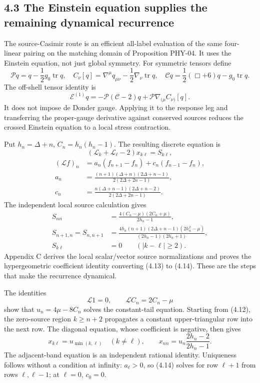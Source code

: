 \documentclass[a4paper,11pt]{article}
\numberwithin{equation}{section}
\begin{document}
\hypertarget{the-einstein-equation-supplies-the-remaining-dynamical-recurrence}{%
\subsection{4.3 The Einstein equation supplies the remaining dynamical recurrence}\label{the-einstein-equation-supplies-the-remaining-dynamical-recurrence}}

The source-Casimir route is an efficient all-label evaluation of the same four-linear pairing on the matching domain of Proposition PHY-04. It uses the Einstein equation, not just global symmetry. For symmetric tensors define \[
\mathcal Pq=q-\frac12g_0\operatorname{tr}q,\quad
C_\nu[q]=\nabla^\mu q_{\mu\nu}-\frac12\nabla_\nu\operatorname{tr}q,\quad
\mathcal Cq=\frac12(\Box+6)q-g_0\operatorname{tr}q .
\] The off-shell tensor identity is \[
\mathcal E^{(1)}q
=-\mathcal P(\mathcal C-2)q
+\mathcal P\nabla_{(\mu}C_{\nu)}[q].
\tag{4.13}
\] It does not impose de Donder gauge. Applying it to the response leg and transferring the proper-gauge derivative against conserved sources reduces the crossed Einstein equation to a local stress contraction.

Put \(h_n=\Delta+n\), \(C_n=h_n(h_n-1)\). The resulting discrete equation is \[
(\mathcal L_k+\mathcal L_\ell-2)x_{k\ell}=S_{k\ell},
\tag{4.14}
\] \[
\begin{aligned}
(\mathcal Lf)_n&=a_n(f_{n+1}-f_n)+c_n(f_{n-1}-f_n),\\
a_n&=\frac{(n+1)(\Delta+n)(2\Delta+n-1)}
{2(2\Delta+2n-1)},\\
c_n&=\frac{n(\Delta+n-1)(2\Delta+n-2)}
{2(2\Delta+2n-1)} .
\end{aligned}
\tag{4.15}
\] The independent local source calculation gives \[
\begin{aligned}
S_{nn}&=\frac{4(C_n-\mu)(2C_n+\mu)}{2h_n-1},\\
S_{n+1,n}=S_{n,n+1}
&=\frac{4h_n(n+1)(2\Delta+n-1)(2h_n^2-\mu)}
{(2h_n-1)(2h_n+1)},\\
S_{k\ell}&=0\qquad(|k-\ell|\ge2).
\end{aligned}
\tag{4.16}
\] Appendix C derives the local scalar/vector source normalizations and proves the hypergeometric coefficient identity converting (4.13) to (4.14). These are the steps that make the recurrence dynamical.

The identities \[
\mathcal L1=0,\qquad \mathcal LC_n=2C_n-\mu
\tag{4.17}
\] show that \(u_n=4\mu-8C_n\) solves the constant-tail equation. Starting from (4.12), the zero-source region \(k\ge n+2\) propagates a constant upper-triangular row into the next row. The diagonal equation, whose coefficient is negative, then gives \[
x_{k\ell}=u_{\min(k,\ell)}\quad(k\ne\ell),\qquad
x_{nn}=u_n\frac{2h_n-2}{2h_n-1}.
\tag{4.18}
\] The adjacent-band equation is an independent rational identity. Uniqueness follows without a condition at infinity: \(a_\ell>0\), so (4.14) solves for row \(\ell+1\) from rows \(\ell,\ell-1\); at \(\ell=0\), \(c_0=0\).
\end{document}
